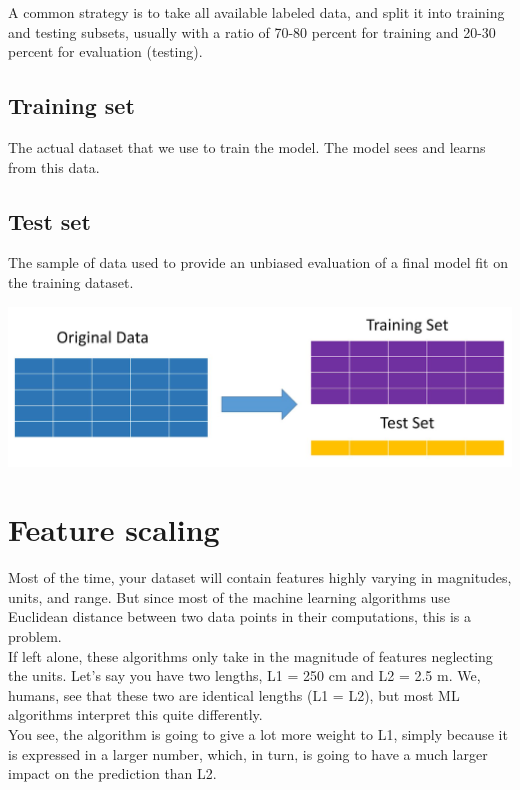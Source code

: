 \documentclass{42-en}
\begin{document}
A common strategy is to take all available labeled data, and split it into training and testing subsets, usually with a ratio of 70-80 percent for training and 20-30 percent for evaluation (testing).\\

\subsection*{Training set}
The actual dataset that we use to train the model. The model sees and learns from this data.
\subsection*{Test set}
The sample of data used to provide an unbiased evaluation of a final model fit on the training dataset.

\centerline{\includegraphics[width=150mm]{images/training_test.png}}

\section*{Feature scaling}

Most of the time, your dataset will contain features highly varying in magnitudes, units, and range. But since most of the machine learning algorithms use Euclidean distance between two data points in their computations, this is a problem.\\

If left alone, these algorithms only take in the magnitude of features neglecting the units. Let’s say you have two lengths, L1 = 250 cm and L2 = 2.5 m. We, humans, see that these two are identical lengths (L1 = L2), but most ML algorithms interpret this quite differently.\\

You see, the algorithm is going to give a lot more weight to L1, simply because it is expressed in a larger number, which, in turn, is going to have a much larger impact on the prediction than L2.\\
\end{document}
